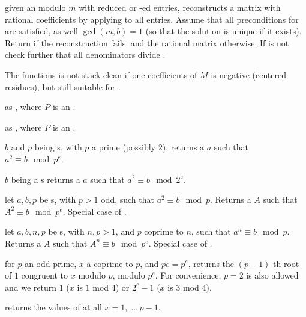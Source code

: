 given an  modulo $m$ with reduced or -ed entries,
reconstructs a matrix with rational coefficients by applying 
to all entries. Assume that all preconditions for  are
satisfied, as well $\gcd(m,b) = 1$ (so that the solution is unique if it
exists). Return  if the reconstruction fails, and the rational
matrix otherwise. If  is not  check further that all
denominators divide .

The functions is not stack clean if one coefficients of $M$ is negative
(centered residues), but still suitable for .

 as
, where $P$ is an .

 as
, where $P$ is an .


 $b$ and $p$ being s, with $p$
a prime (possibly $2$), returns a  $a$ such that $a^2 \equiv b \mod
p^e$.

 $b$ being a s
returns a  $a$ such that $a^2 \equiv b \mod 2^e$.

 let
$a,b,p$ be s, with $p > 1$ odd, such that $a^2\equiv b\mod p$.
Returns a  $A$ such that $A^2 \equiv b \mod p^e$. Special case
of .

 let
$a,b,n,p$ be s, with $n,p > 1$, and $p$ coprime to $n$,
such that $a^n \equiv b \mod p$. Returns a  $A$ such that
$A^n \equiv b \mod p^e$. Special case of .

 for $p$ an odd prime,
$x$ a  coprime to $p$, and $pe = p^e$, returns the $(p-1)$-th root of
$1$ congruent to $x$ modulo $p$, modulo $p^e$. For convenience, $p = 2$ is
also allowed and we return $1$ ($x$ is $1$ mod $4$) or $2^e - 1$ ($x$ is $3$
mod $4$).

 returns the values of
 at all $x = 1, \dots, p-1$.


